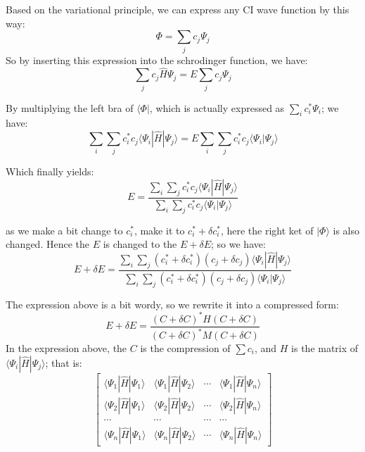 Based on the variational principle, we can express any CI wave
function by this way:
\begin{equation}\label{CIeq:4}
  \Phi = \sum_{j}c_{j}\Psi_{j}
\end{equation}
So by inserting this expression into the schrodinger function, we
have:
\begin{equation}\label{CIeq:5}
  \sum_{j}c_{j}\hat{H}\Psi_{j} = E\sum_{j}c_{j}\Psi_{j}
\end{equation}

By multiplying the left bra of $\langle\Phi|$, which is actually
expressed as $\sum_{i}c_{i}^{*}\Psi_{i}$; we have:
\begin{equation}\label{CIeq:6}
  \sum\limits_{i}\sum\limits_{j}c_{i}^{*}c_{j}\langle\Psi_{i}|\hat{H}|\Psi_{j}\rangle
  =E\sum\limits_{i}\sum\limits_{j}c_{i}^{*}c_{j}\langle\Psi_{i}|\Psi_{j}\rangle
\end{equation}

Which finally yields:
\begin{equation}\label{CIeq:7}
  E=\frac{\sum_{i}\sum_{j}c_{i}^{*}c_{j}\langle\Psi_{i}|\hat{H}|\Psi_{j}\rangle}
  {\sum_{i}\sum_{j}c_{i}^{*}c_{j}\langle\Psi_{i}|\Psi_{j}\rangle}
\end{equation}

as we make a bit change to $c_{i}^{*}$, make it to $c_{i}^{*}+\delta
c_{i}^{*}$, here the right ket of $|\Phi\rangle$ is also changed.
Hence the $E$ is changed to the $E+\delta E$; so we have:
\begin{equation} \label{CIeq:8} E+\delta E =
  \frac{\sum_{i}\sum_{j}(c_{i}^{*}+\delta c_{i}^{*})(c_{j}+\delta
    c_{j}) \langle\Psi_{i}|\hat{H}|\Psi_{j}\rangle}
  {\sum_{i}\sum_{j}(c_{i}^{*}+\delta c_{i}^{*})(c_{j}+\delta c_{j})
    \langle\Psi_{i}|\Psi_{j}\rangle}
\end{equation}

The expression above is a bit wordy, so we rewrite it into a
compressed form:
\begin{equation}\label{CIeq:9}
  E+\delta E = \frac{(C+\delta C)^{*}H(C+\delta C)}{(C+\delta C)^{*}M(C+\delta C)}
\end{equation}
In the expression above, the $C$ is the compression of $\sum c_{i}$,
and $H$ is the matrix of $\langle\Psi_{i}|\hat{H}|\Psi_{j}\rangle$;
that is:
\begin{equation}\label{CIeq:10}
  \left [ \begin{array}{cccc}
      \langle\Psi_{1}|\hat{H}|\Psi_{1}\rangle & \langle\Psi_{1}|\hat{H}|\Psi_{2}\rangle & \cdots & \langle\Psi_{1}|\hat{H}|\Psi_{n}\rangle \\
      \langle\Psi_{2}|\hat{H}|\Psi_{1}\rangle & \langle\Psi_{2}|\hat{H}|\Psi_{2}\rangle & \cdots & \langle\Psi_{2}|\hat{H}|\Psi_{n}\rangle \\
      \cdots & \cdots & \cdots & \cdots                                  \\
      \langle\Psi_{n}|\hat{H}|\Psi_{1}\rangle & \langle\Psi_{n}|\hat{H}|\Psi_{2}\rangle & \cdots & \langle\Psi_{n}|\hat{H}|\Psi_{n}\rangle
    \end{array} \right ]
\end{equation}

